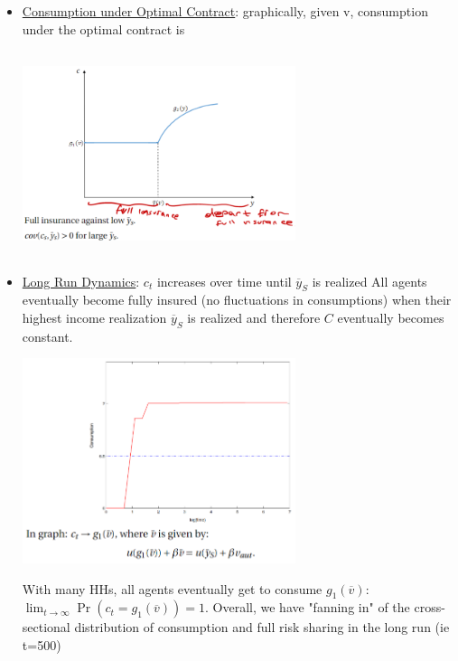 \documentclass{article}
\begin{document}
\begin{itemize}
    \begin{itemize}
        \item \underline{Consumption under Optimal Contract}: graphically, given v, consumption under the optimal contract is
            \newline
            \begin{center}
            \includegraphics[width=8cm, height=6cm]{pic12}
            \end{center}
        \item \underline{Long Run Dynamics}: $c_{t}$ increases over time until $\overline{y}_{S}$ is realized
            All agents eventually become fully insured (no fluctuations in consumptions) when their highest income realization $\overline{y}_{S}$ is realized and therefore $C$ eventually becomes constant.
            \newline
            \begin{center}
            \includegraphics[width=8cm, height=6cm]{pic13}
            \end{center}
            With many HHs, all agents eventually get to consume $g_{1}(\overline{v})$: $\lim_{t \rightarrow \infty} \Pr(c_{t} = g_{1}(\overline{v})) = 1$. Overall, we have "fanning in" of the cross-sectional distribution of consumption and full risk sharing in the long run (ie t=500)
            \newline

\end{itemize}
\end{itemize}
\end{document}
